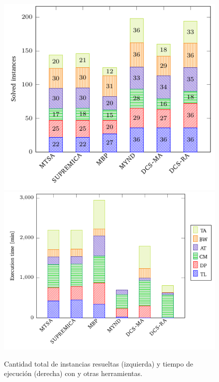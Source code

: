 \begin{figure}[th]
	\centering
	\vspace{10cm}
	\hspace{-2cm}
	\begin{minipage}[T]{1.20\linewidth}
		\vspace{-95mm}
		\includegraphics[scale=.905]{figures/nuestrosResults/instances.pdf}\label{fig:dcs:results:instances}
		\includegraphics[scale=.905]{figures/nuestrosResults/time.pdf}\label{fig:dcs:results:time}
	\end{minipage}
	\caption{Cantidad total de instancias resueltas (izquierda) y tiempo de ejecución (derecha) con \DCS y otras herramientas.}
	\label{fig:dcs:results}
\end{figure}










